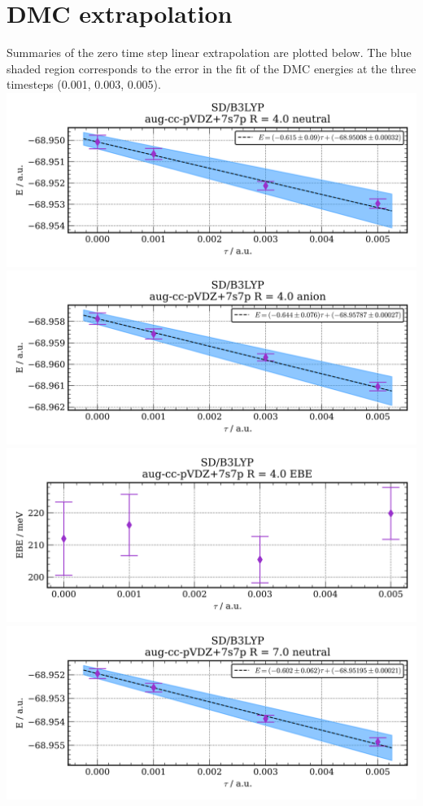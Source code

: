\section{DMC extrapolation}
Summaries of the zero time step linear extrapolation are plotted below. The blue shaded region corresponds to the error in the fit of the DMC energies at the three timesteps (0.001, 0.003, 0.005).
\newpage
\includegraphics[width=\textwidth,keepaspectratio]{images/SDshivB3LYP__aug-cc-pvdz+7s7p__4p0_01_neutral.png}
\includegraphics[width=\textwidth,keepaspectratio]{images/SDshivB3LYP__aug-cc-pvdz+7s7p__4p0_02_anion.png}
\includegraphics[width=\textwidth,keepaspectratio]{images/SDshivB3LYP__aug-cc-pvdz+7s7p__4p0_03_ebe.png}
\includegraphics[width=\textwidth,keepaspectratio]{images/SDshivB3LYP__aug-cc-pvdz+7s7p__7p0_01_neutral.png}
